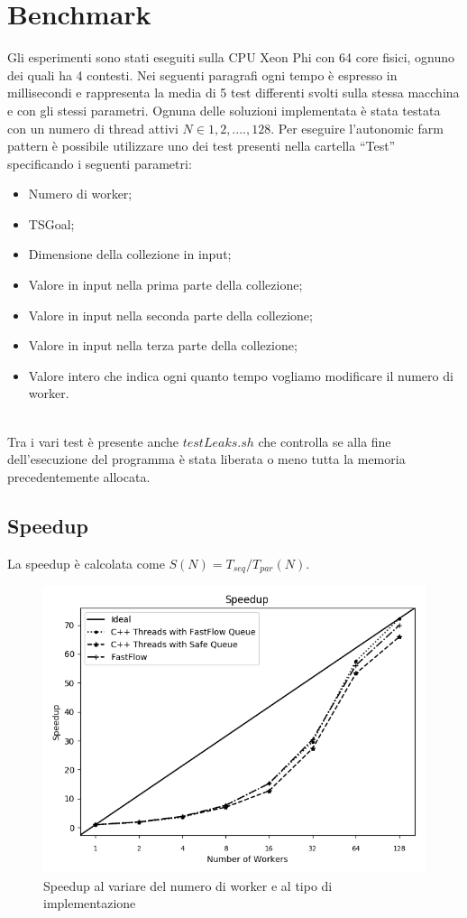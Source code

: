 \documentclass[12pt]{report}
\begin{document}
\chapter{Benchmark}

Gli esperimenti sono stati eseguiti sulla CPU Xeon Phi con 64 core fisici, ognuno dei quali ha 4 contesti.
Nei seguenti paragrafi ogni tempo è espresso in millisecondi e rappresenta la media di 5 test differenti svolti sulla stessa macchina e con gli stessi parametri.
Ognuna delle soluzioni implementata è stata testata con un numero di thread attivi $N \in {1,2,...., 128}$.
Per eseguire l'autonomic farm pattern è possibile utilizzare uno dei test presenti nella cartella ``Test'' specificando i seguenti parametri:
\begin{itemize}
\item Numero di worker;
\item TSGoal;
\item Dimensione della collezione in input;
\item Valore in input nella prima parte della collezione;
\item Valore in input nella seconda parte della collezione;
\item Valore in input nella terza parte della collezione;
\item Valore intero che indica ogni quanto tempo vogliamo modificare il numero di worker.
\end{itemize}\\Tra i vari test è presente anche $testLeaks.sh$ che controlla se alla fine dell'esecuzione del programma è stata liberata o meno tutta la memoria precedentemente allocata.

\newpage
\section{Speedup}

La speedup è calcolata come $S(N) = T_{seq}/T_{par}(N)$.

\begin{figure}[H]
\centering
  \includegraphics[width=0.65\linewidth]{Speedup.png}
  \caption{Speedup al variare del numero di worker e al tipo di implementazione}
  \label{Speedup}
\end{figure}
\end{document}
